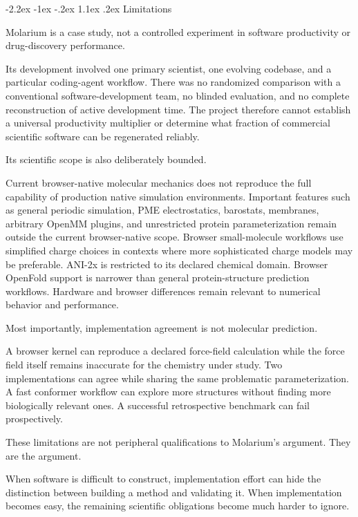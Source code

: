 \documentclass[11pt]{article}
\makeatletter
\renewcommand\section{\@startsection{section}{1}{\z@}%
  {-2.2ex \@plus -1ex \@minus -.2ex}%
  {1.1ex \@plus .2ex}%
  {\normalfont\Large\bfseries\color{molblue}}}
\makeatother
\begin{document}
\section{Limitations}

Molarium is a case study, not a controlled experiment in software productivity or drug-discovery performance.

Its development involved one primary scientist, one evolving codebase, and a particular coding-agent workflow. There was no randomized comparison with a conventional software-development team, no blinded evaluation, and no complete reconstruction of active development time. The project therefore cannot establish a universal productivity multiplier or determine what fraction of commercial scientific software can be regenerated reliably.

Its scientific scope is also deliberately bounded.

Current browser-native molecular mechanics does not reproduce the full capability of production native simulation environments. Important features such as general periodic simulation, PME electrostatics, barostats, membranes, arbitrary OpenMM plugins, and unrestricted protein parameterization remain outside the current browser-native scope. Browser small-molecule workflows use simplified charge choices in contexts where more sophisticated charge models may be preferable. ANI-2x is restricted to its declared chemical domain. Browser OpenFold support is narrower than general protein-structure prediction workflows. Hardware and browser differences remain relevant to numerical behavior and performance.

Most importantly, implementation agreement is not molecular prediction.

A browser kernel can reproduce a declared force-field calculation while the force field itself remains inaccurate for the chemistry under study. Two implementations can agree while sharing the same problematic parameterization. A fast conformer workflow can explore more structures without finding more biologically relevant ones. A successful retrospective benchmark can fail prospectively.

These limitations are not peripheral qualifications to Molarium's argument. They are the argument.

When software is difficult to construct, implementation effort can hide the distinction between building a method and validating it. When implementation becomes easy, the remaining scientific obligations become much harder to ignore.
\end{document}
